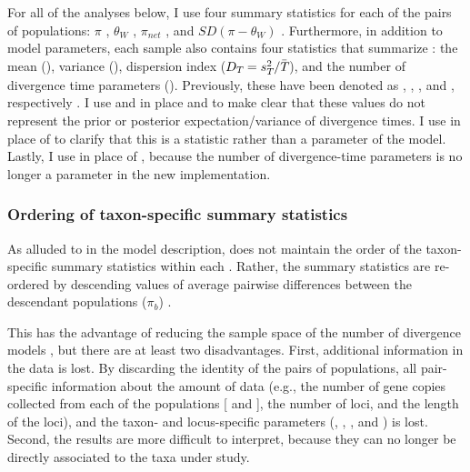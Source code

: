 For all of the analyses below, I use four summary statistics for each of
the pairs of populations:
$\pi$ \cite{Tajima1983}, $\theta_W$ \cite{Watterson1975}, $\pi_{net}$
\cite{Takahata1985}, and $SD(\pi-\theta_W)$ \cite{Tajima1989}.
Furthermore, in addition to model parameters, each sample \hpvector{}
also contains four statistics that summarize \divTimeMapVector:
the mean (\divTimeMean), variance (\divTimeVar), dispersion index
($D_{T_{}} = s^{2}_{T_{}}/\bar{T_{}}$), and the number
of divergence time parameters (\divTimeNum).
Previously, these have been denoted as \meant{}{}, \vart{}{}, \vmratio{}, and
\numt{}, respectively \cite{Hickerson2006,Huang2011,Oaks2012}.
I use \divTimeMean and \divTimeVar in place \meant{}{} and \vart{}{} to make
clear that these values do not represent the prior or posterior
expectation/variance of divergence times.
I use \divTimeDispersion in place of \vmratio{} to clarify that this is a
statistic rather than a parameter of the model.
Lastly, I use \divTimeNum in place of \numt{}, because the number of
divergence-time parameters is no longer a parameter in the new implementation.

\subsubsection{Ordering of taxon-specific summary statistics}
As alluded to in the model description, \msb does not maintain the order of the
taxon-specific summary statistics \alignmentSS{}{} within each \ssVector{}.
Rather, the summary statistics are re-ordered by descending values of average
pairwise differences between the descendant populations
($\pi_b$) \cite{NeiLi1979,Huang2011}.

This has the advantage of reducing the sample space of the number of
divergence models \divTimeIndexVector, but there are at least two disadvantages.
First, additional information in the data is lost.
By discarding the identity of the \npairs{} pairs of populations, all
pair-specific information about the amount of data (e.g., the number of gene
copies collected from each of the populations [ and
], the number of loci, and the length of the loci), and the
taxon- and locus-specific parameters (\hkyModel{}{},
\mutationRateScalarConstant{}{}, \ploidyScalar{}{}, and
\locusMutationRateScalar{}) is lost.
Second, the results are more difficult to interpret, because they can no
longer be directly associated to the taxa under study.

